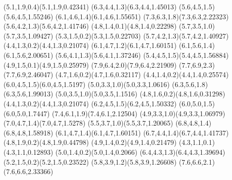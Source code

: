 \pstThreeDLine[linecolor=gray](5.1,1.9,0.4)(5.1,1.9,0.42341)
\pstThreeDLine[linecolor=gray](6.3,4.4,1.3)(6.3,4.4,1.45013)
\pstThreeDLine[linecolor=gray](5.6,4.5,1.5)(5.6,4.5,1.55246)
\pstThreeDLine[linecolor=gray](6.1,4.6,1.4)(6.1,4.6,1.55651)
\pstThreeDLine[linecolor=gray](7.3,6.3,1.8)(7.3,6.3,2.22323)
\pstThreeDLine[linecolor=gray](5.6,4.2,1.3)(5.6,4.2,1.41746)
\pstThreeDLine[linecolor=gray](4.8,1.4,0.1)(4.8,1.4,0.22298)
\pstThreeDLine[linecolor=gray](5.7,3.5,1.0)(5.7,3.5,1.09427)
\pstThreeDLine[linecolor=gray](5.3,1.5,0.2)(5.3,1.5,0.22703)
\pstThreeDLine[linecolor=gray](5.7,4.2,1.3)(5.7,4.2,1.40927)
\pstThreeDLine[linecolor=gray](4.4,1.3,0.2)(4.4,1.3,0.21074)
\pstThreeDLine[linecolor=gray](6.1,4.7,1.2)(6.1,4.7,1.60151)
\pstThreeDLine[linecolor=gray](6.1,5.6,1.4)(6.1,5.6,2.00651)
\pstThreeDLine[linecolor=gray](5.6,4.1,1.3)(5.6,4.1,1.37246)
\pstThreeDLine[linecolor=gray](5.4,4.5,1.5)(5.4,4.5,1.56884)
\pstThreeDLine[linecolor=gray](4.9,1.5,0.1)(4.9,1.5,0.25979)
\pstThreeDLine[linecolor=gray](7.9,6.4,2.0)(7.9,6.4,2.21909)
\pstThreeDLine[linecolor=gray](7.7,6.9,2.3)(7.7,6.9,2.46047)
\pstThreeDLine[linecolor=gray](4.7,1.6,0.2)(4.7,1.6,0.32117)
\pstThreeDLine[linecolor=gray](4.4,1.4,0.2)(4.4,1.4,0.25574)
\pstThreeDLine[linecolor=gray](6.0,4.5,1.5)(6.0,4.5,1.5197)
\pstThreeDLine[linecolor=gray](5.0,3.3,1.0)(5.0,3.3,1.0616)
\pstThreeDLine[linecolor=gray](6.3,5.6,1.8)(6.3,5.6,1.99013)
\pstThreeDLine[linecolor=gray](5.0,3.5,1.0)(5.0,3.5,1.1516)
\pstThreeDLine[linecolor=gray](4.8,1.6,0.2)(4.8,1.6,0.31298)
\pstThreeDLine[linecolor=gray](4.4,1.3,0.2)(4.4,1.3,0.21074)
\pstThreeDLine[linecolor=gray](6.2,4.5,1.5)(6.2,4.5,1.50332)
\pstThreeDLine[linecolor=gray](6.0,5.0,1.5)(6.0,5.0,1.7447)
\pstThreeDLine[linecolor=gray](7.4,6.1,1.9)(7.4,6.1,2.12504)
\pstThreeDLine[linecolor=gray](4.9,3.3,1.0)(4.9,3.3,1.06979)
\pstThreeDLine[linecolor=gray](7.0,4.7,1.4)(7.0,4.7,1.5278)
\pstThreeDLine[linecolor=gray](5.5,3.7,1.0)(5.5,3.7,1.20065)
\pstThreeDLine[linecolor=gray](6.8,4.8,1.4)(6.8,4.8,1.58918)
\pstThreeDLine[linecolor=gray](6.1,4.7,1.4)(6.1,4.7,1.60151)
\pstThreeDLine[linecolor=gray](6.7,4.4,1.4)(6.7,4.4,1.41737)
\pstThreeDLine[linecolor=gray](4.8,1.9,0.2)(4.8,1.9,0.44798)
\pstThreeDLine[linecolor=gray](4.9,1.4,0.2)(4.9,1.4,0.21479)
\pstThreeDLine[linecolor=gray](4.3,1.1,0.1)(4.3,1.1,0.12893)
\pstThreeDLine[linecolor=gray](5.0,1.4,0.2)(5.0,1.4,0.2066)
\pstThreeDLine[linecolor=gray](6.4,4.3,1.3)(6.4,4.3,1.39694)
\pstThreeDLine[linecolor=gray](5.2,1.5,0.2)(5.2,1.5,0.23522)
\pstThreeDLine[linecolor=gray](5.8,3.9,1.2)(5.8,3.9,1.26608)
\pstThreeDLine[linecolor=gray](7.6,6.6,2.1)(7.6,6.6,2.33366)
